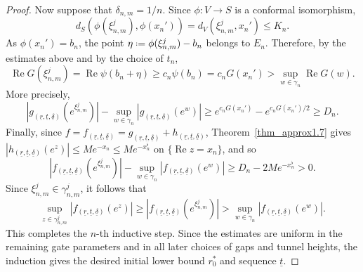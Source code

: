 \documentclass[a4paper, 11pt, reqno]{amsart}
\numberwithin{equation}{section}
\theoremstyle{plain}
\newcommand*{\defeq}{\mathrel{\vcenter{\baselineskip0.5ex \lineskiplimit0pt
 \hbox{\scriptsize.}\hbox{\scriptsize.}}}=}
\theoremstyle{remark}
\newcommand{\uldelta}{\underline{\delta}}
\newcommand{\ulr}{\underline{r}}
\newcommand{\ult}{\underline{t}}
\newcommand{\Rea}{\operatorname{Re }}
\begin{document}
\begin{proof}
	Now suppose that \(\delta_{n,m}=1/n\). Since \(\phi:V\to S\) is a
	conformal isomorphism,
	\[
	d_S(\phi(\xi^j_{n,m}),\phi(x_n'))
	=
	d_V(\xi^j_{n,m},x_n')
	\le K_n.
	\]
	As \(\phi(x_n')=b_n\), the point
	$
	\eta\defeq \phi(\xi^j_{n,m})-b_n
	$
	belongs to \(E_n\). Therefore, by the estimates above and by the choice of \(t_n\),
	\[
	\Rea G(\xi^j_{n,m})
	=
	\Rea\psi(b_n+\eta)
	\ge c_n\psi(b_n)
	=
	c_nG(x_n') >
	\sup_{w\in\gamma_n}\Rea G(w).
	\]
	More precisely,
	\[
	|g_{(\ulr,\ult,\uldelta)}(e^{\xi^j_{n,m}})|
	-
	\sup_{w\in\gamma_n}|g_{(\ulr,\ult,\uldelta)}(e^w)|
	\ge
	e^{c_nG(x_n')}-e^{c_nG(x_n')/2}
	\ge D_n.
	\]
	Finally, since
	\(f=f_{(\ulr,\ult,\uldelta)}=g_{(\ulr,\ult,\uldelta)}+h_{(\ulr,\ult,\uldelta)}\), Theorem~\ref{thm_approx1.7}
	gives
	\(
	|h_{(\ulr,\ult,\uldelta)}(e^z)|\le Me^{-x_n}\le Me^{-x_n^\flat}
	\) on \(\{\Rea z=x_n\}\), and so
	\[
	|f_{(\ulr,\ult,\uldelta)}(e^{\xi^j_{n,m}})|
	-
	\sup_{w\in\gamma_n}|f_{(\ulr,\ult,\uldelta)}(e^w)|
	\ge
	D_n-2Me^{-x_n^\flat}>0.
	\]
	Since \(\xi^j_{n,m}\in\gamma^j_{n,m}\), it follows that
	\[
	\sup_{z\in\gamma^j_{n,m}}
	|f_{(\ulr,\ult,\uldelta)}(e^z)|
	\ge
	|f_{(\ulr,\ult,\uldelta)}(e^{\xi^j_{n,m}})|
	>
	\sup_{w\in\gamma_n}
	|f_{(\ulr,\ult,\uldelta)}(e^w)|.
	\]
	This completes the \(n\)-th inductive step. Since the estimates are uniform in the remaining gate parameters and in all later choices of gaps and tunnel heights, the induction gives the desired initial lower bound \(r_0^*\) and sequence \(\ult\).
\end{proof}
\end{document}
